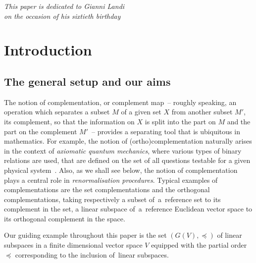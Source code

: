 \documentclass[pdftex]{sigma}
\numberwithin{equation}{section}
\newcommand{\pone}{separating\xspace }
\begin{document}


\begin{flushright}
\begin{minipage}{70mm}
\it This paper is dedicated to Gianni Landi\\ on the occasion of his sixtieth birthday
\end{minipage}
\end{flushright}

\renewcommand{\thefootnote}{\arabic{footnote}}
\setcounter{footnote}{0}

\section{Introduction}
\subsection{The general setup and our aims}

The notion of complementation, or complement map~-- roughly speaking, an operation which separates a subset $M$ of a given set $X$ from another
subset $M'$, its complement, so that the information on $X$ is split into the part on $M$ and the part on the complement $M'$~-- provides a \pone tool that is ubiquitous in mathematics.
For example, the notion of (ortho)complementation naturally arises in the context of {\it axiomatic quantum mechanics}, where various types of binary relations are used, that are defined on the set of all questions testable
for a given physical system~\cite{CN}.
Also, as we shall see below, the notion of complementation
 plays a central role in {\it renormalisation procedures}. Typical examples of complementations are the set complementations and the orthogonal complementations, taking respectively a subset of~a~reference set to its complement in the set, a linear subspace of~a~reference Euclidean vector space to its orthogonal complement in the space.

Our guiding example throughout this paper is the set $(G(V), \preceq)$ of linear subspaces in a finite dimensional vector space
$V$ equipped with the partial order $\preceq $ corresponding to the inclusion of~linear subspaces.
\end{document}
